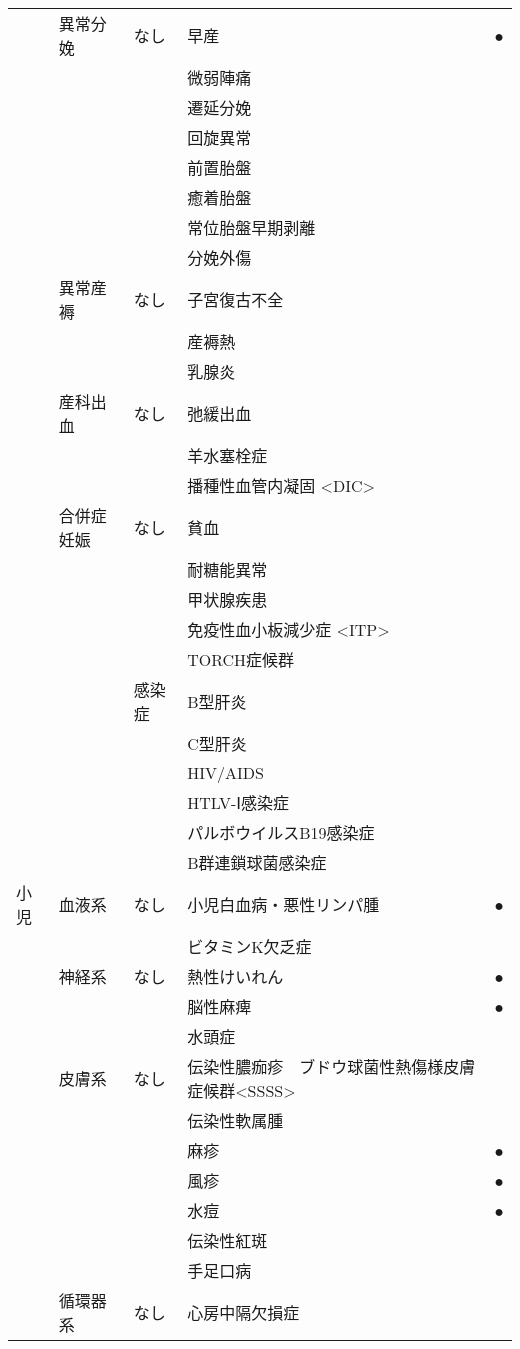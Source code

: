 \begin{xltabular}{\linewidth}{XXXXX}
 & 異常分娩 & なし & 早産 & ● \\
 &  &  & 微弱陣痛 &  \\
 &  &  & 遷延分娩 &  \\
 &  &  & 回旋異常 &  \\
 &  &  & 前置胎盤 &  \\
 &  &  & 癒着胎盤 &  \\
 &  &  & 常位胎盤早期剥離 &  \\
 &  &  & 分娩外傷 &  \\
 & 異常産褥 & なし & 子宮復古不全 &  \\
 &  &  & 産褥熱 &  \\
 &  &  & 乳腺炎 &  \\
 & 産科出血 & なし & 弛緩出血 &  \\
 &  &  & 羊水塞栓症 &  \\
 &  &  & 播種性血管内凝固 <DIC>  &  \\
 & 合併症妊娠 & なし & 貧血 &  \\
 &  &  & 耐糖能異常 &  \\
 &  &  & 甲状腺疾患 &  \\
 &  &  & 免疫性血小板減少症 <ITP> &  \\
 &  &  & TORCH症候群 &  \\
 &  & 感染症 & B型肝炎 &  \\
 &  &  & C型肝炎 &  \\
 &  &  & HIV/AIDS &  \\
 &  &  & HTLV-Ⅰ感染症 &  \\
 &  &  & パルボウイルスB19感染症 &  \\
 &  &  & B群連鎖球菌感染症 &  \\
小児 & 血液系 & なし & 小児白血病・悪性リンパ腫 & ● \\
 &  &  & ビタミンK欠乏症 &  \\
 & 神経系 & なし & 熱性けいれん & ● \\
 &  &  & 脳性麻痺 & ● \\
 &  &  & 水頭症 &  \\
 & 皮膚系 & なし & 伝染性膿痂疹　ブドウ球菌性熱傷様皮膚症候群<SSSS> &  \\
 &  &  & 伝染性軟属腫 &  \\
 &  &  & 麻疹 & ● \\
 &  &  & 風疹 & ● \\
 &  &  & 水痘 & ● \\
 &  &  & 伝染性紅斑 &  \\
 &  &  & 手足口病 &  \\
 & 循環器系 & なし & 心房中隔欠損症 &  \\

\end{xltabular}
